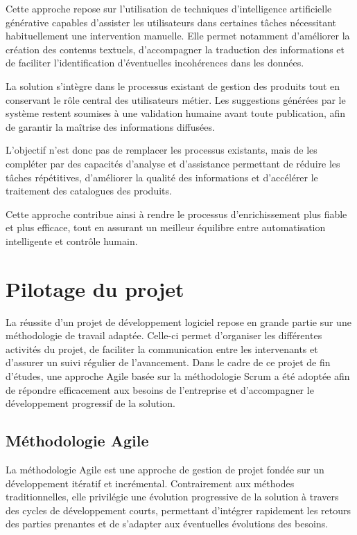 Cette approche repose sur l'utilisation de techniques d'intelligence artificielle générative capables d'assister les utilisateurs dans certaines tâches nécessitant habituellement une intervention manuelle. Elle permet notamment d'améliorer la création des contenus textuels, d'accompagner la traduction des informations et de faciliter l'identification d'éventuelles incohérences dans les données.

La solution s'intègre dans le processus existant de gestion des produits tout en conservant le rôle central des utilisateurs métier. Les suggestions générées par le système restent soumises à une validation humaine avant toute publication, afin de garantir la maîtrise des informations diffusées.

L'objectif n'est donc pas de remplacer les processus existants, mais de les compléter par des capacités d'analyse et d'assistance permettant de réduire les tâches répétitives, d'améliorer la qualité des informations et d'accélérer le traitement des catalogues des produits.

Cette approche contribue ainsi à rendre le processus d'enrichissement plus fiable et plus efficace, tout en assurant un meilleur équilibre entre automatisation intelligente et contrôle humain.







\section{Pilotage du projet}

La réussite d'un projet de développement logiciel repose en grande partie sur une méthodologie de travail adaptée. Celle-ci permet d'organiser les différentes activités du projet, de faciliter la communication entre les intervenants et d'assurer un suivi régulier de l'avancement. Dans le cadre de ce projet de fin d'études, une approche Agile basée sur la méthodologie Scrum a été adoptée afin de répondre efficacement aux besoins de l'entreprise et d'accompagner le développement progressif de la solution.

\subsection{Méthodologie Agile}

La méthodologie Agile est une approche de gestion de projet fondée sur un développement itératif et incrémental. Contrairement aux méthodes traditionnelles, elle privilégie une évolution progressive de la solution à travers des cycles de développement courts, permettant d'intégrer rapidement les retours des parties prenantes et de s'adapter aux éventuelles évolutions des besoins.

